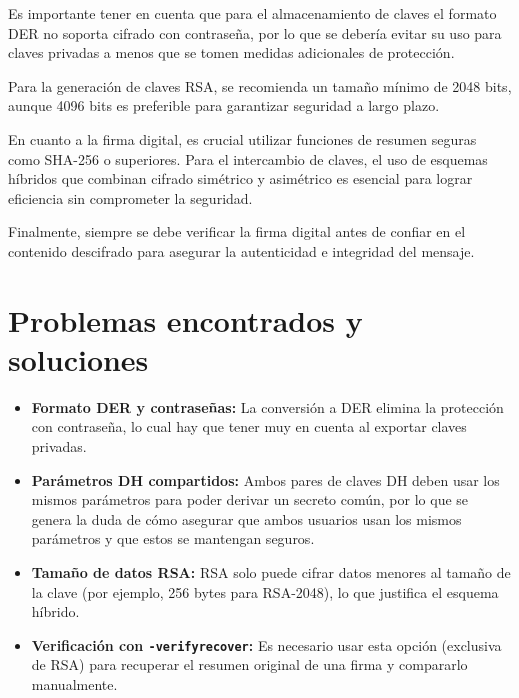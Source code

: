 \documentclass[12pt,a4paper]{report}
\begin{document}
Es importante tener en cuenta que para el almacenamiento de claves el formato DER no soporta cifrado con contraseña, por lo que se debería evitar su uso para claves privadas a menos que se tomen medidas adicionales de protección.

Para la generación de claves RSA, se recomienda un tamaño mínimo de 2048 bits, aunque 4096 bits es preferible para garantizar seguridad a largo plazo.

En cuanto a la firma digital, es crucial utilizar funciones de resumen seguras como SHA-256 o superiores. Para el intercambio de claves, el uso de esquemas híbridos que combinan cifrado simétrico y asimétrico es esencial para lograr eficiencia sin comprometer la seguridad.

Finalmente, siempre se debe verificar la firma digital antes de confiar en el contenido descifrado para asegurar la autenticidad e integridad del mensaje.

\section{Problemas encontrados y soluciones}

\begin{itemize}[label=\textbullet]
    \item \textbf{Formato DER y contraseñas:} La conversión a DER elimina la 
    protección con contraseña, lo cual hay que tener muy en cuenta al exportar 
    claves privadas.
    \item \textbf{Parámetros DH compartidos:} Ambos pares de claves DH deben usar 
    los mismos parámetros para poder derivar un secreto común, por lo que se genera
    la duda de cómo asegurar que ambos usuarios usan los mismos parámetros y que estos
    se mantengan seguros.
    \item \textbf{Tamaño de datos RSA:} RSA solo puede cifrar datos menores al 
    tamaño de la clave (por ejemplo, 256 bytes para RSA-2048), lo que justifica 
    el esquema híbrido.
    \item \textbf{Verificación con \texttt{-verifyrecover}:} Es necesario usar 
    esta opción (exclusiva de RSA) para recuperar el resumen original de una firma
     y compararlo manualmente.
\end{itemize}

\end{document}
